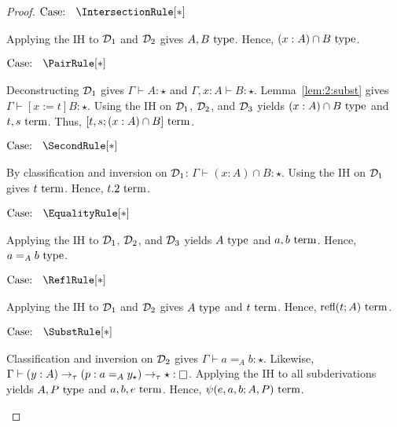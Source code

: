 \begin{proof}
    $\text{Case: }\begin{array}{c} \IntersectionRule[*] \end{array}$
    \begin{proofcase}
        Applying the IH to $\mathcal{D}_{1}$ and $\mathcal{D}_{2}$ gives $A, B~\textnormal{type}$.
        Hence, $(x : A) \cap B~\textnormal{type}$.
    \end{proofcase}

    $\text{Case: }\begin{array}{c} \PairRule[*] \end{array}$
    \begin{proofcase}
        Deconstructing $\mathcal{D}_{1}$ gives $\Gamma \vdash A : \star$ and $\Gamma, x : A \vdash B : \star$.
        Lemma~\ref{lem:2:subst} gives $\Gamma \vdash [x := t]B : \star$.
        Using the IH on $\mathcal{D}_{1}$, $\mathcal{D}_{2}$, and $\mathcal{D}_{3}$ yields $(x : A) \cap B~\textnormal{type}$ and $t, s~\textnormal{term}$.
        Thus, $[t, s; (x : A) \cap B]~\textnormal{term}$.
    \end{proofcase}

    $\text{Case: }\begin{array}{c} \SecondRule[*] \end{array}$
    \begin{proofcase}
        By classification and inversion on $\mathcal{D}_{1}$: $\Gamma \vdash (x : A) \cap B : \star$.
        Using the IH on $\mathcal{D}_{1}$ gives $t~\textnormal{term}$.
        Hence, $t.2~\textnormal{term}$.
    \end{proofcase}

    $\text{Case: }\begin{array}{c} \EqualityRule[*] \end{array}$
    \begin{proofcase}
        Applying the IH to $\mathcal{D}_{1}$, $\mathcal{D}_{2}$, and $\mathcal{D}_{3}$ yields $A~\textnormal{type}$ and $a, b~\textnormal{term}$.
        Hence, $a =_A b~\textnormal{type}$.
    \end{proofcase}

    $\text{Case: }\begin{array}{c} \ReflRule[*] \end{array}$
    \begin{proofcase}
        Applying the IH to $\mathcal{D}_{1}$ and $\mathcal{D}_{2}$ gives $A~\textnormal{type}$ and $t~\textnormal{term}$.
        Hence, $\textnormal{refl}(t; A)~\textnormal{term}$.
    \end{proofcase}

    $\text{Case: }\begin{array}{c} \SubstRule[*] \end{array}$
    \begin{proofcase}
        Classification and inversion on $\mathcal{D}_{2}$ gives $\Gamma \vdash a =_A b : \star$.
        Likewise, $\Gamma \vdash (y : A) \to_\tau (p : a =_A y_\star) \to_\tau \star : \kind$.
        Applying the IH to all subderivations yields $A, P~\textnormal{type}$ and $a, b, e~\textnormal{term}$.
        Hence, $\psi(e, a, b; A, P)~\textnormal{term}$.
    \end{proofcase}


\end{proof}
